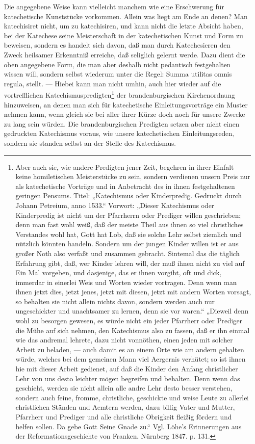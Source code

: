 Die angegebene Weise kann vielleicht manchem wie eine Erschwerung für katechetische Kunststücke vorkommen. Allein was liegt am Ende an denen? Man katechisiret nicht, um zu katechisiren, und kann nicht die letzte Absicht haben, bei der Katechese seine Meisterschaft in der katechetischen Kunst und Form zu beweisen, sondern es handelt sich davon, daß man durch Katechesieren den Zweck heilsamer Erkenntniß erreiche, daß seliglich gelernt werde. Dazu dient die oben angegebene Form, die man aber deshalb nicht pedantisch festgehalten wissen will, sondern selbst wiederum unter die Regel: Summa utilitas omnis regula, stellt. — Hiebei kann man nicht
umhin, auch hier wieder auf die vortrefflichen Katechismuspredigten\footnote{Aber auch sie, wie andere Predigten jener Zeit, begehren in ihrer Einfalt keine homiletischen Meisterstücke zu sein, sondern verdienen unsern Preis nur als katechetische Vorträge und in Anbetracht des in ihnen festgehaltenen geringen Pensums. Titel: „Katechismus oder Kinderpredig. Gedruckt durch Johann Petreium, anno 1533.“ Vorwort: „Dieser Katechismus oder Kinderpredig ist nicht um der Pfarrherrn oder Prediger willen geschrieben; denn man fast wohl weiß, daß der meiste Theil aus ihnen so viel christliches Verstandes wohl hat, Gott hat Lob, daß sie solche Lehr selbst ziemlich und nützlich könnten handeln. Sondern um der jungen Kinder willen ist er aus großer Noth also verfaßt und zusammen gebracht. Sintemal das die täglich Erfahrung gibt, daß, wer Kinder lehren will, der muß ihnen nicht zu viel auf Ein Mal vorgeben, und dasjenige, das er ihnen vorgibt, oft und dick, immerdar in einerlei Weis und Worten wieder vortragen. Denn wenn man ihnen jetzt dies, jetzt jenes, jetzt mit diesen, jetzt mit andern Worten vorsagt, so behalten sie nicht allein nichts davon, sondern werden auch nur ungeschickter und unachtsamer zu lernen, denn sie vor waren.“ „Dieweil denn wohl zu besorgen gewesen, es würde nicht ein jeder Pfarrherr oder Prediger die Mühe auf sich nehmen, den Katechismus also zu fassen, daß er ihn einmal wie das andremal lehrete, dazu nicht vonnöthen, einen jeden mit solcher Arbeit zu beladen, — auch damit es an einem Orte wie am andern gehalten würde, welches bei dem gemeinen Mann viel Aergernis verhütet; so ist ihnen hie mit dieser Arbeit gedienet, auf daß die Kinder den Anfang christlicher Lehr von uns desto leichter mögen begreifen und behalten. Denn wenn das geschieht, werden sie nicht allein alle andre Lehr desto besser verstehen, sondern auch feine, fromme, christliche, geschickte und weise Leute zu allerlei christlichen Ständen und Aemtern werden, dazu billig Vater und Mutter, Pfarrherr und Prediger und alle christliche Obrigkeit fleißig fördern und helfen sollen. Da gebe Gott Seine Gnade zu.“ Vgl. Löhe’s Erinnerungen aus der Reformationsgeschichte von Franken. Nürnberg 1847. p. 131.} der brandenburgischen Kirchenordnung hinzuweisen, an denen man sich für katechetische Einleitungsvorträge ein Muster nehmen kann, wenn gleich sie bei aller ihrer Kürze doch noch
für unsere Zwecke zu lang sein würden. Die brandenburgischen Predigten setzen aber nicht einen gedruckten Katechismus voraus, wie unsere katechetischen Einleitungsreden, sondern sie standen selbst an der Stelle des Katechismus.

